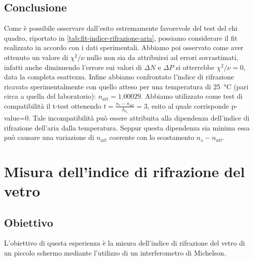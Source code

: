 \documentclass[a4paper]{article}
\begin{document}
\subsection{Conclusione}
Come è possibile osservare dall'esito estremamente favorevole del test del chi quadro, riportato in \cref{tab:fit-indice-rifrazione-aria}, possiamo considerare il fit realizzato in accordo con i dati sperimentali. Abbiamo poi osservato come aver ottenuto un valore di $\chi^2/\nu$ nullo non sia da attribuirsi ad errori sovrastimati, infatti anche diminuendo l'errore sui valori di $\Delta N$ e $\Delta P$ si otterrebbe $\chi^2/\nu= 0$, data la completa esattezza. Infine abbiamo confrontato l'indice di rifrazione ricavato sperimentalmente con quello atteso per una temperatura di \SI{25}{\celsius} (pari circa a quella del laboratorio): $n_{att} =\num{1.00029}$. Abbiamo utilizzato come test di compatibilità il t-test ottenendo $t= \frac{n_s-n_{att}}{\delta_{n_s}}=3$, esito al quale corrisponde p-value=0. Tale incompatibilità può essere attribuita alla dipendenza dell'indice di rifrazione dell'aria dalla temperatura. Seppur questa dipendenza sia minima essa può causare una variazione di $n_{att}$ coerente con lo scostamento $n_s-n_{att}$.

\section{Misura dell'indice di rifrazione del vetro}
\subsection{Obiettivo}
L'obiettivo di questa esperienza è la misura dell'indice di rifrazione del vetro di un piccolo schermo mediante l'utilizzo di un interferometro di Michelson.
\end{document}
